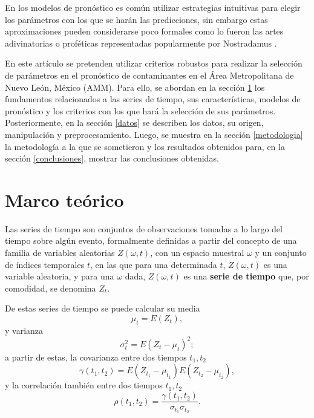 \documentclass{elsarticle}
\begin{document}
En los modelos de pronóstico es común utilizar estrategias intuitivas para elegir los parámetros con los que se harán las predicciones, sin embargo estas aproximaciones pueden considerarse poco formales como lo fueron las artes adivinatorias o proféticas representadas popularmente por Nostradamus \cite{Popkin1984}. 

En este artículo se pretenden utilizar criterios robustos para realizar la selección de parámetros en el pronóstico de contaminantes en el Área Metropolitana de Nuevo León, México (AMM). Para ello, se abordan en la sección \ref{mt} los fundamentos relacionados a las series de tiempo, sus características, modelos de pronóstico y los criterios con los que hará la selección de sus parámetros. Posteriormente, en la sección \ref{datos} se describen los datos, su origen, manipulación y preprocesamiento. Luego, se muestra en la sección \ref{metodologia} la metodología a la que se sometieron y los resultados obtenidos para, en la sección \ref{conclusiones}, mostrar las conclusiones obtenidas.

\section{Marco teórico}
\label{mt}

Las series de tiempo son conjuntos de observaciones tomadas a lo largo del tiempo sobre algún evento, formalmente definidas \cite{Wei2019} a partir del concepto de una familia de variables aleatorias $Z(\omega, t)$, con un espacio muestral $\omega$ y un conjunto de índices temporales $t$, en las que para una determinada $t$, $Z(\omega, t)$ es una variable aleatoria, y para una $\omega$ dada, $Z(\omega, t)$ es una \textbf{serie de tiempo} que, por comodidad, se denomina $Z_t$.

De estas series de tiempo se puede calcular su media
\begin{equation}
\mu_t = E(Z_t),
\end{equation}
y varianza 
\begin{equation}
\sigma^2_t = E(Z_t - \mu_t)^2;
\end{equation}
a partir de estas, la covarianza entre dos tiempos $t_1, t_2$
\begin{equation}
\gamma(t_1, t_2) = E(Z_{t_{1}} - \mu_{t_{1}}) E(Z_{t_{2}} - \mu_{t_{2}}),
\end{equation}
y la correlación también entre dos tiempos $t_1, t_2$
\begin{equation}
    \rho (t_1, t_2) = \frac{\gamma (t_1, t_2)}{\sigma_{t_{1}} \sigma_{t_{2}}}.
\end{equation}
\end{document}
